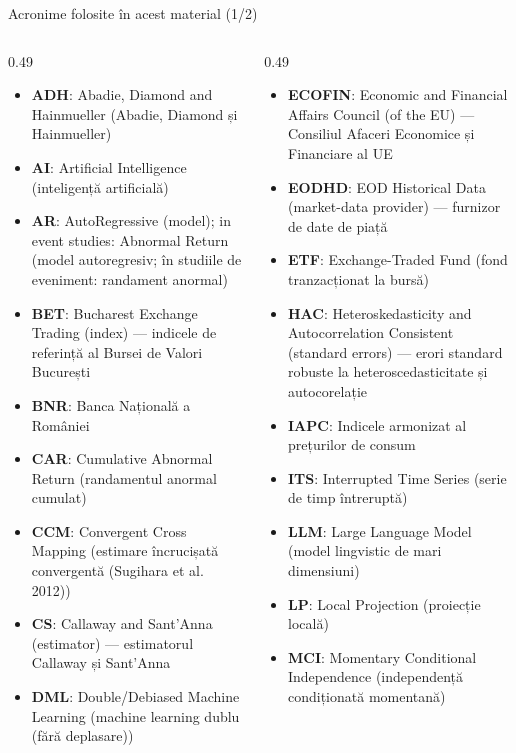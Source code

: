 \begin{frame}{Acronime folosite în acest material (1/2)}
\begin{columns}[T]
\begin{column}{0.49\textwidth}
\begin{itemize}\setlength{\itemsep}{0pt}
    \item \textbf{ADH}: Abadie, Diamond and Hainmueller (Abadie, Diamond și Hainmueller)
    \item \textbf{AI}: Artificial Intelligence (inteligență artificială)
    \item \textbf{AR}: AutoRegressive (model); in event studies: Abnormal Return (model autoregresiv; în studiile de eveniment: randament anormal)
    \item \textbf{BET}: Bucharest Exchange Trading (index) — indicele de referință al Bursei de Valori București
    \item \textbf{BNR}: Banca Națională a României
    \item \textbf{CAR}: Cumulative Abnormal Return (randamentul anormal cumulat)
    \item \textbf{CCM}: Convergent Cross Mapping (estimare încrucișată convergentă (Sugihara et al. 2012))
    \item \textbf{CS}: Callaway and Sant'Anna (estimator) — estimatorul Callaway și Sant'Anna
    \item \textbf{DML}: Double/Debiased Machine Learning (machine learning dublu (fără deplasare))
\end{itemize}
\end{column}
\begin{column}{0.49\textwidth}
\begin{itemize}\setlength{\itemsep}{0pt}
    \item \textbf{ECOFIN}: Economic and Financial Affairs Council (of the EU) — Consiliul Afaceri Economice și Financiare al UE
    \item \textbf{EODHD}: EOD Historical Data (market-data provider) — furnizor de date de piață
    \item \textbf{ETF}: Exchange-Traded Fund (fond tranzacționat la bursă)
    \item \textbf{HAC}: Heteroskedasticity and Autocorrelation Consistent (standard errors) — erori standard robuste la heteroscedasticitate și autocorelație
    \item \textbf{IAPC}: Indicele armonizat al prețurilor de consum
    \item \textbf{ITS}: Interrupted Time Series (serie de timp întreruptă)
    \item \textbf{LLM}: Large Language Model (model lingvistic de mari dimensiuni)
    \item \textbf{LP}: Local Projection (proiecție locală)
    \item \textbf{MCI}: Momentary Conditional Independence (independență condiționată momentană)
\end{itemize}
\end{column}
\end{columns}
\end{frame}
